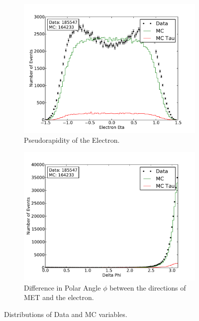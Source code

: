 \documentclass[
	paper=A4,
	parskip=full,
	chapterprefix=true,
	11pt,
	headings=normal,
	bibliography=totoc,
	listof=totoc,
	titlepage=on,
]{scrreprt}
\begin{document}
\begin{figure}%
	\centering
	\begin{subfigure}{0.45\textwidth}
		\includegraphics{nocuts/eta_el}
		\caption{Pseudorapidity of the Electron.}
	\end{subfigure}
	\begin{subfigure}{0.45\textwidth}
		\includegraphics{nocuts/delta_phi}
		\caption{Difference in Polar Angle $\phi$ between the directions of MET and the electron.}
	\end{subfigure}
	\caption{Distributions of Data and MC variables.}
	\label{fig:no_cuts_etadphi}
\end{figure}
\end{document}
